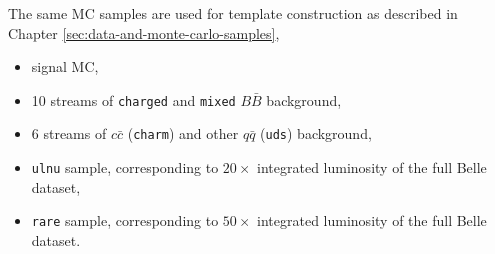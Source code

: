 The same MC samples are used for template construction as described in Chapter \ref{sec:data-and-monte-carlo-samples},
\begin{itemize}
\item signal MC,
\item 10 streams of \texttt{charged} and \texttt{mixed} $B \bar B$ background,
\item 6 streams of $c \bar c$ (\texttt{charm}) and other $q \bar q$ (\texttt{uds}) background,
\item \texttt{ulnu} sample, corresponding to $20\times$ integrated luminosity of the full Belle dataset,
\item \texttt{rare} sample, corresponding to $50\times$ integrated luminosity of the full Belle dataset.
\end{itemize}

